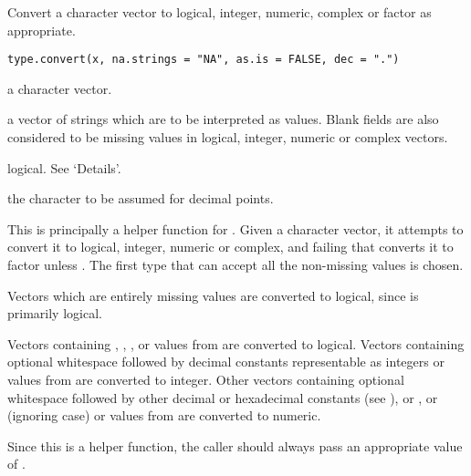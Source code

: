 %
\begin{Description}\relax
Convert a character vector to logical, integer, numeric, complex or
factor as appropriate.
\end{Description}
%
\begin{Usage}
\begin{verbatim}
type.convert(x, na.strings = "NA", as.is = FALSE, dec = ".")
\end{verbatim}
\end{Usage}
%
\begin{Arguments}
\begin{ldescription}
\item[\code{x}] a character vector.

\item[\code{na.strings}] a vector of strings which are to be interpreted as
 values.  Blank fields are also considered to be
missing values in logical, integer, numeric or complex vectors.

\item[\code{as.is}] logical.  See `Details'.

\item[\code{dec}] the character to be assumed for decimal points.
\end{ldescription}
\end{Arguments}
%
\begin{Details}\relax
This is principally a helper function for .
Given a character vector, it attempts to convert it to logical,
integer, numeric or complex, and failing that converts it to factor
unless .  The first type that can accept all the
non-missing values is chosen.

Vectors which are entirely missing values are converted to logical,
since  is primarily logical.

Vectors containing , , ,  or
values from  are converted to logical.  Vectors
containing optional whitespace followed by decimal constants
representable as \R{} integers or values from  are
converted to integer.  Other vectors containing optional whitespace
followed by other decimal or hexadecimal constants (see
), or ,  or 
(ignoring case) or values from  are converted to
numeric.

Since this is a helper function, the caller should always pass an
appropriate value of .
\end{Details}
